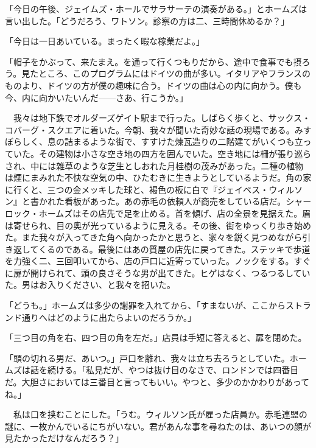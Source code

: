 \documentclass[tate,paper=b6j,jafontsize=9pt]{jlreq}
\begin{document}

「今日の午後、ジェイムズ・ホールでサラサーテの演奏がある。」とホームズは言い出した。「どうだろう、ワトソン。診察の方は二、三時間休めるか？」

「今日は一日あいている。まったく暇な稼業だよ。」

「帽子をかぶって、来たまえ。を通って行くつもりだから、途中で食事でも摂ろう。見たところ、このプログラムにはドイツの曲が多い。イタリアやフランスのものより、ドイツの方が僕の趣味に合う。ドイツの曲は心の内に向かう。僕も今、内に向かいたいんだ------さあ、行こうか。」

　我々は地下鉄でオルダーズゲイト駅まで行った。しばらく歩くと、サックス・コバーグ・スクエアに着いた。今朝、我々が聞いた奇妙な話の現場である。みすぼらしく、息の詰まるような街で、すすけた煉瓦造りの二階建てがいくつも立っていた。その建物は小さな空き地の四方を囲んでいた。空き地には柵が張り巡らされ、中には雑草のような芝生としおれた月桂樹の茂みがあった。二種の植物は煙にまみれた不快な空気の中、ひたむきに生きようとしているようだ。角の家に行くと、三つの金メッキした球と、褐色の板に白で『ジェイベス・ウィルソン』と書かれた看板があった。あの赤毛の依頼人が商売をしている店だ。シャーロック・ホームズはその店先で足を止める。首を傾げ、店の全景を見据えた。眉は寄せられ、目の奥が光っているように見える。その後、街をゆっくり歩き始めた。また我々が入ってきた角へ向かったかと思うと、家々を鋭く見つめながら引き返してくるのである。最後にはあの質屋の店先に戻ってきた。ステッキで歩道を力強く二、三回叩いてから、店の戸口に近寄っていった。ノックをする。すぐに扉が開けられて、頭の良さそうな男が出てきた。ヒゲはなく、つるつるしていた。男はお入りください、と我々を招いた。

「どうも。」ホームズは多少の謝罪を入れてから、「すまないが、ここからストランド通りへはどのように出たらよいのだろうか。」

「三つ目の角を右、四つ目の角を左だ。」店員は手短に答えると、扉を閉めた。


「頭の切れる男だ、あいつ。」戸口を離れ、我々は立ち去ろうとしていた。ホームズは話を続ける。「私見だが、やつは抜け目のなさで、ロンドンでは四番目だ。大胆さにおいては三番目と言ってもいい。やつと、多少のかかわりがあってね。」

　私は口を挟むことにした。「うむ。ウィルソン氏が雇った店員か。赤毛連盟の謎に、一枚かんでいるにちがいない。君があんな事を尋ねたのは、あいつの顔が見たかっただけなんだろう？」
\end{document}
